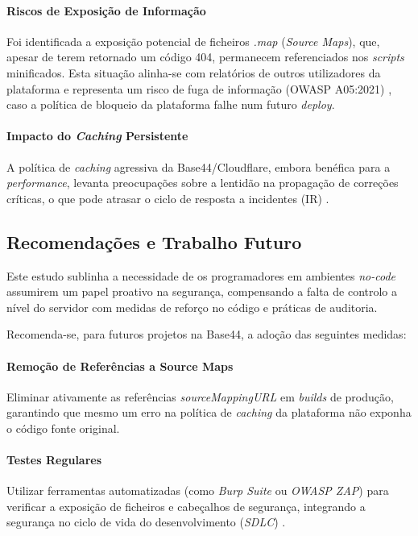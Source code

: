 \paragraph{Riscos de Exposição de Informação}
Foi identificada a exposição potencial de ficheiros \textit{.map} (\textit{Source Maps}), que, apesar de terem retornado um código 404,
permanecem referenciados nos \textit{scripts} minificados.
Esta situação alinha-se com relatórios de outros utilizadores da plataforma \cite{ref22} e representa um risco de fuga de informação (OWASP A05:2021) \cite{ref21},
caso a política de bloqueio da plataforma falhe num futuro \textit{deploy}.

\paragraph{Impacto do \textit{Caching} Persistente}
A política de \textit{caching} agressiva da Base44/Cloudflare, embora benéfica para a \textit{performance},
levanta preocupações sobre a lentidão na propagação de correções críticas, o que pode atrasar o ciclo de resposta a incidentes (IR) \cite{ref28}.

\subsection{Recomendações e Trabalho Futuro}

Este estudo sublinha a necessidade de os programadores em ambientes \textit{no-code} assumirem um papel proativo na segurança,
compensando a falta de controlo a nível do servidor com medidas de reforço no código e práticas de auditoria.

Recomenda-se, para futuros projetos na Base44, a adoção das seguintes medidas:

\paragraph{Remoção de Referências a Source Maps}
Eliminar ativamente as referências \textit{sourceMappingURL} em \textit{builds} de produção,
garantindo que mesmo um erro na política de \textit{caching} da plataforma não exponha o código fonte original.

\paragraph{Testes Regulares}
Utilizar ferramentas automatizadas (como \textit{Burp Suite} ou \textit{OWASP ZAP}) \cite{ref23} para verificar a exposição de ficheiros e cabeçalhos de segurança,
integrando a segurança no ciclo de vida do desenvolvimento (\textit{SDLC}) \cite{ref4}.

